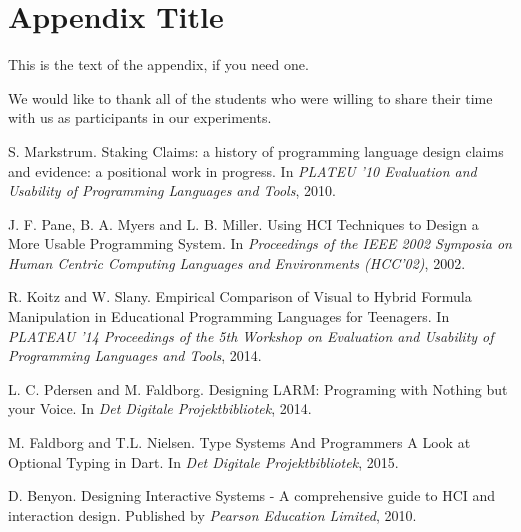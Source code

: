 \documentclass[preprint,10pt]{sigplanconf}
\begin{document}
\appendix
\section{Appendix Title}

This is the text of the appendix, if you need one.

\acks
We would like to thank all of the students who were willing to share their time with us as participants in our experiments.





\begin{thebibliography}{}
\softraggedright

S. Markstrum. \newblock Staking Claims: a history of programming language design claims and evidence: a positional work in progress. \newblock In \emph{PLATEU '10 Evaluation and Usability of Programming Languages and Tools}, 2010.

J. F. Pane, B. A. Myers and L. B. Miller. \newblock Using HCI Techniques to Design a More Usable Programming System. \newblock In \emph{Proceedings of the IEEE 2002 Symposia on Human Centric Computing Languages and Environments (HCC’02)}, 2002.

R. Koitz and W. Slany. \newblock Empirical Comparison of Visual to Hybrid Formula Manipulation in Educational Programming Languages for Teenagers. \newblock In \emph{PLATEAU '14 Proceedings of the 5th Workshop on Evaluation and Usability of Programming Languages and Tools}, 2014.

L. C. Pdersen and M. Faldborg. \newblock Designing LARM: Programing with Nothing but your Voice. \newblock In \emph{Det Digitale Projektbibliotek}, 2014.

M. Faldborg and T.L. Nielsen. \newblock Type Systems And Programmers \: A Look at Optional Typing in Dart. \newblock In \emph{Det Digitale Projektbibliotek}, 2015.

D. Benyon. \newblock Designing Interactive Systems - A comprehensive guide to HCI and interaction design. \newblock Published by \emph{Pearson Education Limited}, 2010.


\end{thebibliography}
\end{document}
